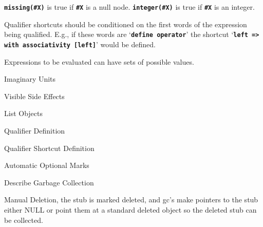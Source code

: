 \documentclass[12pt]{article}
\newcommand{\TT}[1]{{\tt \bfseries #1}}
\begin{document}
\TT{missing(\#X)} is true if \TT{\#X} is a null node.
\TT{integer(\#X)} is true if \TT{\#X} is an integer.

Qualifier shortcuts should be conditioned on the first words of
the expression being qualified.  E.g., if these words are
`\TT{define operator}' the shortcut `\TT{left => }\TT{with
associativity [left]}' would be defined.

Expressions to be evaluated can have sets of possible values.

Imaginary Units\label{IMAGINARY-UNITS}

Visible Side Effects\label{VISIBLE-SIDE-EFFECTS}

List Objects\label{LIST}

Qualifier Definition\label{QUALIFIER-DEFINITION}

Qualifier Shortcut Definition\label{QUALIFIER-SHORTCUT-DEFINITION}

Automatic Optional Marks\label{AUTOMATIC-OPTIONAL-MARKS}

Describe Garbage Collection\label{GARBAGE-COLLECTION}

Manual Deletion\label{MANUAL-DELETION}, the stub is marked deleted,
and gc's make pointers to the stub either NULL or point them at
a standard deleted object so the deleted stub can be collected.




\printindex
\end{document}
